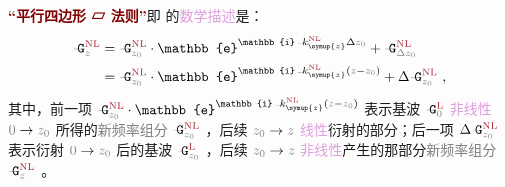 \textbf{\textcolor{Maroon}{“平行四边形 ▱ 法则”}}即  的\textcolor{Plum}{数学描述}是：
\begin{subequations} \label{eq:parallelogram-math}
	\begin{align}
		\xint{\mathcolor{gray}{-}}{20}{\mathtt{G}}^{\text{\textcolor{Maroon}{NL}}}_{\mathcolor{gray}{z}} &= \xint{\mathcolor{gray}{-}}{20}{\mathtt{G}}^{\text{\textcolor{Maroon}{NL}}}_{\mathcolor{gray}{z_0}} \cdot \mathbb{e}^{\mathbb{i} \xint{\begin{smallmatrix} ~ \\ {}^{}_{\mathcolor{gray}{-}} \\ ~ \end{smallmatrix}}{15}{k}^{\text{\textcolor{Maroon}{NL}}}_{\symup{z}} \Delta \mathcolor{gray}{z_0}} + \xint{\mathcolor{gray}{-}}{20}{\mathtt{G}}^{\text{\textcolor{Maroon}{NL}}}_{\mathcolor{gray}{\Delta z_0}} \label{eq:parallelogram-math_a} \\ 
		&= \xint{\mathcolor{gray}{-}}{20}{\mathtt{G}}^{\text{\textcolor{Maroon}{NL}}}_{\mathcolor{gray}{z_0}} \cdot \mathbb{e}^{\mathbb{i} \xint{\begin{smallmatrix} ~ \\ {}^{}_{\mathcolor{gray}{-}} \\ ~ \end{smallmatrix}}{15}{k}^{\text{\textcolor{Maroon}{NL}}}_{\symup{z}} \left( \mathcolor{gray}{z} - \mathcolor{gray}{z_0} \right)} + \Delta \xint{\mathcolor{gray}{-}}{20}{\mathtt{G}}^{\text{\textcolor{Maroon}{NL}}}_{\mathcolor{gray}{z_0}} ~, \label{eq:parallelogram-math_b}
	\end{align}
\end{subequations}
其中，前一项 $\xint{\mathcolor{gray}{-}}{16}{\mathtt{G}}^{\text{\textcolor{Maroon}{NL}}}_{\mathcolor{gray}{z_0}} \cdot \mathbb{e}^{\mathbb{i} \xint{\begin{smallmatrix} ~ \\ {}^{}_{\mathcolor{gray}{-}} \\ ~ \end{smallmatrix}}{15}{k}^{\text{\textcolor{Maroon}{NL}}}_{\symup{z}} \left( \mathcolor{gray}{z} - \mathcolor{gray}{z_0} \right)}$ 表示\textcolor{NavyBlue}{基波} $\xint{\mathcolor{gray}{-}}{16}{\mathtt{G}}^{\text{\textcolor{Maroon}{L}}}_{\mathcolor{gray}{0}}$ \textcolor{Plum}{非线性} $\mathcolor{gray}{0} \to \mathcolor{gray}{z_0}$ 所得的\textcolor{gray}{新频率组分} $\xint{\mathcolor{gray}{-}}{16}{\mathtt{G}}^{\text{\textcolor{Maroon}{NL}}}_{\mathcolor{gray}{z_0}}$ ，后续 $\mathcolor{gray}{z_0} \to \mathcolor{gray}{z}$ \textcolor{Plum}{线性}\textcolor{NavyBlue}{衍射}的部分；后一项 $\Delta \xint{\mathcolor{gray}{-}}{16}{\mathtt{G}}^{\text{\textcolor{Maroon}{NL}}}_{\mathcolor{gray}{z_0}}$ 表示\textcolor{NavyBlue}{衍射} $\mathcolor{gray}{0} \to \mathcolor{gray}{z_0}$ 后的\textcolor{NavyBlue}{基波} $\xint{\mathcolor{gray}{-}}{16}{\mathtt{G}}^{\text{\textcolor{Maroon}{L}}}_{\mathcolor{gray}{z_0}}$ ，后续 $\mathcolor{gray}{z_0} \to \mathcolor{gray}{z}$ \textcolor{Plum}{非线性}产生的那部分\textcolor{gray}{新频率组分} $\xint{\mathcolor{gray}{-}}{16}{\mathtt{G}}^{\text{\textcolor{Maroon}{NL}}}_{\mathcolor{gray}{z}}$ 。

